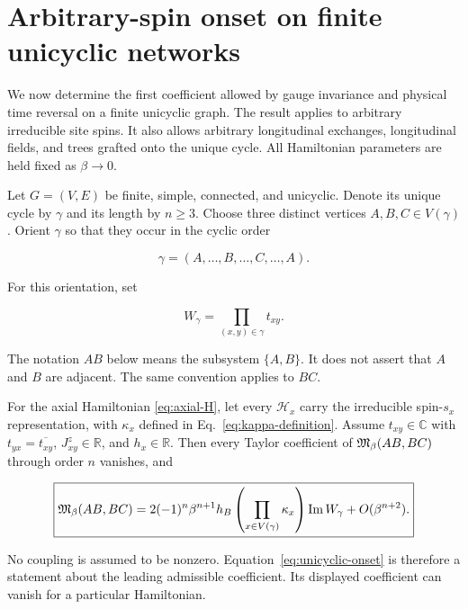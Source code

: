 \section{Arbitrary-spin onset on finite unicyclic networks}
\label{sec:unicyclic}

We now determine the first coefficient allowed by gauge invariance and physical
time reversal on a finite unicyclic graph.  The result applies to arbitrary
irreducible site spins.  It also allows arbitrary longitudinal exchanges,
longitudinal fields, and trees grafted onto the unique cycle.  All Hamiltonian
parameters are held fixed as $\beta\to0$.

Let $G=(V,E)$ be finite, simple, connected, and unicyclic.  Denote its unique
cycle by $\gamma$ and its length by $n\geq3$.  Choose three distinct vertices
$A,B,C\in V(\gamma)$.  Orient $\gamma$ so that they occur in the cyclic order

\begin{equation}
 \gamma=(A,\ldots,B,\ldots,C,\ldots,A).
 \label{eq:marked-cycle-order}
\end{equation}

For this orientation, set

\begin{equation}
 W_\gamma=\prod_{(x,y)\in\gamma}t_{xy}.
 \label{eq:unicyclic-W}
\end{equation}

The notation $AB$ below means the subsystem $\{A,B\}$.  It does not assert
that $A$ and $B$ are adjacent.  The same convention applies to $BC$.

\begin{theorem}
\label{thm:unicyclic-onset}
For the axial Hamiltonian \eqref{eq:axial-H}, let every $\mathcal H_x$ carry
the irreducible spin-$s_x$ representation, with $\kappa_x$ defined in
Eq.~\eqref{eq:kappa-definition}.  Assume $t_{xy}\in\mathbb C$ with
$t_{yx}=\overline{t_{xy}}$, $J^z_{xy}\in\mathbb R$, and $h_x\in\mathbb R$.
Then every Taylor coefficient of
$\mathfrak{M}_\beta(AB,BC)$ through order $n$ vanishes, and

\begin{equation}
 \boxed{
 \mathfrak{M}_\beta(AB,BC)
 =2(-1)^n\beta^{n+1}h_B
 \left(\prod_{x\in V(\gamma)}\kappa_x\right)
 \operatorname{Im}W_\gamma
 +O(\beta^{n+2}) .}
 \label{eq:unicyclic-onset}
\end{equation}

No coupling is assumed to be nonzero.  Equation~\eqref{eq:unicyclic-onset}
is therefore a statement about the leading admissible coefficient.  Its
displayed coefficient can vanish for a particular Hamiltonian.
\end{theorem}

